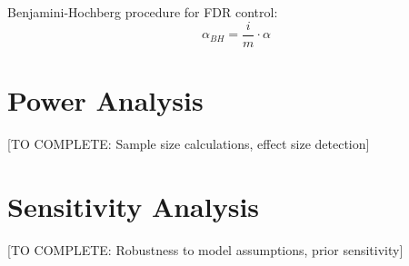 Benjamini-Hochberg procedure for FDR control:
\begin{equation}
\alpha_{BH} = \frac{i}{m} \cdot \alpha
\end{equation}

\section{Power Analysis}

[TO COMPLETE: Sample size calculations, effect size detection]

\section{Sensitivity Analysis}

[TO COMPLETE: Robustness to model assumptions, prior sensitivity]
